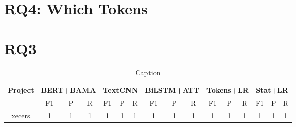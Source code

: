\section{RQ4: Which Tokens}


\section{RQ3}
\begin{table}[]
    \centering
    \begin{tabular}{c|c|c|c|c|c|c|c|c|c|c|c|c|c|c|c}
        \toprule[2pt]
        \multirow{2}{*}{Project} & \multicolumn{3}{|c}{BERT+BAMA} & \multicolumn{3}{|c}{TextCNN} & \multicolumn{3}{|c}{BiLSTM+ATT} & \multicolumn{3}{|c}{Tokens+LR} & \multicolumn{3}{|c}{Stat+LR} \\
        \toprule[1pt]
        \cline{2-3} & F1 & P & R & F1 & P & R & F1 & P & R & F1 & P & R & F1 & P & R \\
        \toprule[2pt]
        xecers & 1 & 1 & 1 & 1 & 1 & 1 & 1 & 1 & 1 & 1 & 1 & 1 & 1 & 1 & 1 & \\
    \end{tabular}
    \caption{Caption}
    \label{tab:my_label}
\end{table}